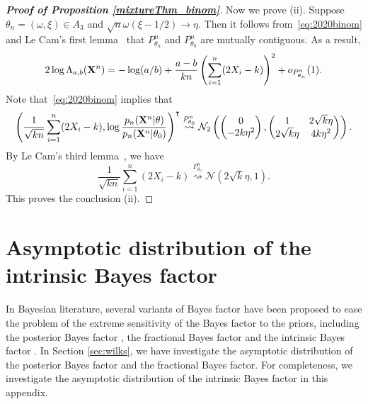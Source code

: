 \documentclass[11pt]{article}
\newcommand{\myT}{\intercal}
\theoremstyle{plain}
\theoremstyle{definition}
\theoremstyle{remark}
\begin{document}
\begin{appendices}
\begin{proof}[\textbf{Proof of Proposition \ref{mixtureThm_binom}}]
Now we prove (ii).
Suppose $\theta_n = (\omega, \xi) \in A_3$ and $\sqrt n \omega (\xi - 1/2) \to \eta$.
Then it follows from~\eqref{eq:2020binom} and Le Cam's first lemma~\citep[Theorem 6.4]{van2000asymptotic} that
$P^n_{\theta_n}$ and $P^n_{\theta_0}$ are mutually contiguous.
As a result,
\begin{align*}
    2\log \Lambda_{a,b} (\mathbf{X}^n)
    =
    -\log(a/b) + \frac{a-b}{kn} \left( \sum_{i=1}^n (2X_i - k)\right)^2 + o_{P_{\theta_n}^n}(1).
\end{align*}
Note that~\eqref{eq:2020binom} implies that
\begin{equation*}
    \left(\frac{1}{\sqrt{kn}}\sum_{i=1}^n (2X_i-k), \log \frac{p_n(\BX^{n}|\theta)}{p_n(\BX^{n}|\theta_0)}\right)^\myT 
        \overset{P^n_{\theta_0}}{\rightsquigarrow}
        \mathcal{N}_2\left(
    \begin{pmatrix}
        0\\
        -2k\eta^2
    \end{pmatrix}
    ,
    \begin{pmatrix}
        1 & 2 \sqrt k \eta\\
        2 \sqrt k \eta & 4k \eta^2
    \end{pmatrix}
\right).
\end{equation*}
By Le Cam's third lemma~\citep[Example 6.7]{van2000asymptotic}, we have
\begin{equation*}
    \frac{1}{\sqrt{kn}}\sum_{i=1}^n (2X_i - k)
    \overset{P^n_{\theta_n}}{\rightsquigarrow} \mathcal{N}(2 \sqrt k \eta,1).
\end{equation*}
This proves the conclusion (ii).


\end{proof}


\section{Asymptotic distribution of the intrinsic Bayes factor}
In Bayesian literature, several variants of Bayes factor have been proposed to ease the problem of the extreme sensitivity of the Bayes factor to the priors, including the posterior Bayes factor \cite{Aitkin1991Posterior}, the fractional Bayes factor \citep{Fractional1995} and the intrinsic Bayes factor \cite{intrinsicBayesFactor}.
In Section \ref{sec:wilks}, we have investigate the asymptotic distribution of the posterior Bayes factor and the fractional Bayes factor.
For completeness, we investigate the asymptotic distribution of the intrinsic Bayes factor in this appendix.


\end{appendices}
\end{document}
